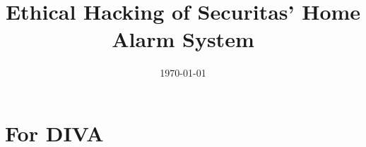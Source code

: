 \documentclass[english]{kththesis}
\date{\today}
\title{Ethical Hacking of Securitas' Home Alarm System}
\begin{document}

\label{pg:lastPageofPreface}

\mainmatter







\printbibliography[title=References]

\appendix
\renewcommand{\chaptermark}[1]{\markboth{Appendix \thechapter\relax:\thinspace\relax#1}{}}

\label{pg:lastPageofMainmatter}

\clearpage
\section*{For DIVA}
\end{document}
